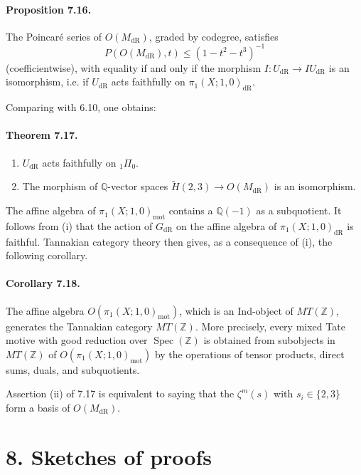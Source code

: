 \documentclass[10pt]{article}
\newcommand{\Q}{\mathbb Q}
\newcommand{\Z}{\mathbb Z}
\newcommand{\Spec}{\operatorname{Spec}}
\newcommand{\dR}{\mathrm{dR}}
\newcommand{\mot}{\mathrm{mot}}
\begin{document}
\paragraph{Proposition 7.16.}
The Poincaré series of $O(M_{\dR})$, graded by codegree, satisfies
\begin{equation}
P(O(M_{\dR}),t)\leq(1-t^2-t^3)^{-1}
\tag{7.16.1}
\end{equation}
(coefficientwise), with equality if and only if the morphism $I:U_{\dR}\to IU_{\dR}$ is an isomorphism, i.e. if $U_{\dR}$ acts faithfully on $\pi_1(X;1,0)_{\dR}$.

Comparing with 6.10, one obtains:

\paragraph{Theorem 7.17.}
\begin{enumerate}[label=(\roman*)]
\item $U_{\dR}$ acts faithfully on ${}_1\Pi_0$.
\item The morphism of $\Q$-vector spaces $\widetilde H(2,3)\to O(M_{\dR})$ is an isomorphism.
\end{enumerate}
The affine algebra of $\pi_1(X;1,0)_{\mot}$ contains a $\Q(-1)$ as a subquotient. It follows from (i) that the action of $G_{\dR}$ on the affine algebra of $\pi_1(X;1,0)_{\dR}$ is faithful. Tannakian category theory then gives, as a consequence of (i), the following corollary.

\paragraph{Corollary 7.18.}
The affine algebra $O(\pi_1(X;1,0)_{\mot})$, which is an Ind-object of $MT(\Z)$, generates the Tannakian category $MT(\Z)$. More precisely, every mixed Tate motive with good reduction over $\Spec(\Z)$ is obtained from subobjects in $MT(\Z)$ of $O(\pi_1(X;1,0)_{\mot})$ by the operations of tensor products, direct sums, duals, and subquotients.

Assertion (ii) of 7.17 is equivalent to saying that the $\zeta^m(s)$ with $s_i\in\{2,3\}$ form a basis of $O(M_{\dR})$.

\section*{8. Sketches of proofs}
\end{document}
